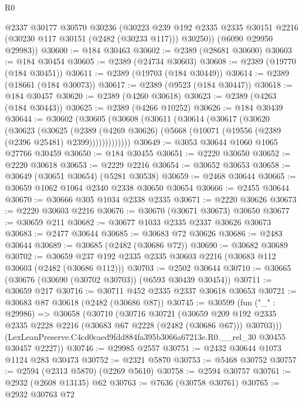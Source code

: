 \begin{lexlean}{R0}
\begin{coremodule}
        @2337
        @30177
        @30570
        @30236
        (@30223
          @239
          @192
          @2335
          @2335
          @30151
          @2216
          (@30230 @117 @30151 (@2482 (@30233 @117)))
          @30250))
      (@6090 @29950 @29983))
@30600 := @184 @30463
@30602 := @2389 (@28681 @30600)
@30603 := @184 @30454
@30605 := @2389 (@24734 @30603)
@30608 := @2389 (@19770 (@184 @30451))
@30611 := @2389 (@19703 (@184 @30449))
@30614 := @2389 (@18661 (@184 @30073))
@30617 := @2389 (@9523 (@184 @30447))
@30618 := @184 @30457
@30620 := @2389 (@4260 @30618)
@30623 := @2389 (@4263 (@184 @30443))
@30625 := @2389 (@4266 @10252)
@30626 := @184 @30439
@30644 := @30602
    (@30605
      (@30608
        (@30611
          (@30614
            (@30617
              (@30620
                (@30623
                  (@30625
                    (@2389
                      (@4269 @30626)
                      (@5668 (@10071 (@19556 (@2389 (@2396 @25481) @2399)))))))))))))
@30649 := @3053 @30644 @1060 @1065 @27766 @30459
@30650 := @184 @30455
@30651 := @2220 @30650
@30652 := @2220 @30618
@30653 := @2229 @2216
@30654 := @30652 @30653
@30658 := @30649 (@30651 @30654) (@5281 @30538)
@30659 := @2468 @30644
@30665 := @30659 @1062 @1064 @2340 @2338 @30650 @30654
@30666 := @2455 @30644
@30670 := @30666 @305 @1034 @2338 @2335
@30671 := @2220 @30626
@30673 := @2220 @30603 @2216
@30676 := @30670 (@30671 @30673) @30650
@30677 := @30659 @211
@30682 := @30677 @1033 @2335 @2337 @30626 @30673
@30683 := @2477 @30644
@30685 := @30683 @72 @30626
@30686 := @2483 @30644
@30689 := @30685 (@2482 (@30686 @72))
@30690 := @30682 @30689
@30702 := @30659 @237 @192 @2335 @2335 @30603 @2216 (@30683 @112 @30603 (@2482 (@30686 @112)))
@30703 := @2502 @30644
@30710 := @30665 (@30676 (@30690 (@30702 @30703)) (@6593 @30439 @30454))
@30711 := @30659 @217
@30716 := @30711 @452 @2335 @2337 @30618 @30653
@30721 := @30683 @87 @30618 (@2482 (@30686 @87))
@30745 := @30599
    (fun ("_" : @29986) =>
    @30658
      (@30710
        (@30716
          @30721
          (@30659
            @209
            @192
            @2335
            @2335
            @2228
            @2216
            (@30683 @67 @2228 (@2482 (@30686 @67)))
            @30703)))
      (LexLeanPreserve.C4cd0caed9fdd884fa395b3066a67213e.R0.__rel_30 @30455 @30457 @2227))
@30746 := @29985 @2557
@30751 := @2432 @30644 @1073 @1124 @283 @30473
@30752 := @2321 @5870
@30753 := @5468 @30752
@30757 := @2594 (@2313 @5870) (@2269 @5610)
@30758 := @2594 @30757
@30761 := @2932 (@2608 @13135) @62
@30763 := @7636 (@30758 @30761)
@30765 := @2932 @30763 @72

\end{coremodule}
\end{lexlean}
